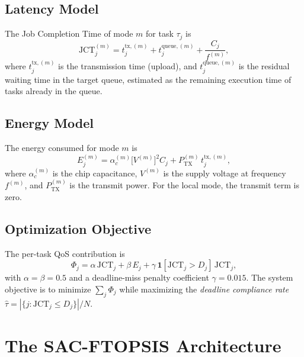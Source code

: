 \documentclass[iicol]{sn-jnl}
\begin{document}
\subsection{Latency Model}

The Job Completion Time of mode $m$ for task $\tau_j$ is
\begin{equation}
  \mathrm{JCT}_j^{(m)} = t_j^{\mathrm{tx},(m)} + t_j^{\mathrm{queue},(m)}
                         + \frac{C_j}{f^{(m)}},
  \label{eq:jct}
\end{equation}
where $t_j^{\mathrm{tx},(m)}$ is the transmission time (upload), and
$t_j^{\mathrm{queue},(m)}$ is the residual waiting time in the target queue,
estimated as the remaining execution time of tasks already in the queue.

\subsection{Energy Model}

The energy consumed for mode $m$ is
\begin{equation}
  E_j^{(m)} = \alpha_c^{(m)} \bigl[V^{(m)}\bigr]^2 C_j
             + P_{\mathrm{TX}}^{(m)}\,t_j^{\mathrm{tx},(m)},
  \label{eq:energy}
\end{equation}
where $\alpha_c^{(m)}$ is the chip capacitance, $V^{(m)}$ is the supply voltage
at frequency $f^{(m)}$, and $P_{\mathrm{TX}}^{(m)}$ is the transmit power.
For the local mode, the transmit term is zero.

\subsection{Optimization Objective}

The per-task QoS contribution is
\begin{equation}
  \Phi_j = \alpha\,\mathrm{JCT}_j + \beta\,E_j
            + \gamma\,\mathbf{1}[\mathrm{JCT}_j > D_j]\,\mathrm{JCT}_j,
  \label{eq:obj}
\end{equation}
with $\alpha=\beta=0.5$ and a deadline-miss penalty coefficient $\gamma=0.015$.
The system objective is to minimize $\sum_j \Phi_j$ while maximizing the
\emph{deadline compliance rate} $\hat{\tau} = |\{j : \mathrm{JCT}_j \le D_j\}|/N$.

\section{The SAC-FTOPSIS Architecture}
\label{sec:arch}
\end{document}

